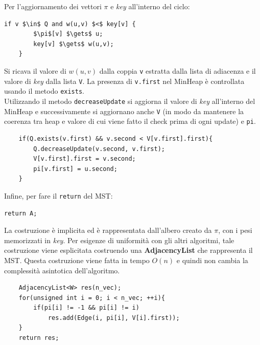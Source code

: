 \documentclass[]{article}
\begin{document}
\begin{flushleft}
	Per l'aggiornamento dei vettori $\pi$ e \textit{key} all'interno del ciclo:
	\begin{lstlisting}[mathescape=true]
	if v $\in$ Q and w(u,v) $<$ key[v] {
		$\pi$[v] $\gets$ u;
		key[v] $\gets$ w(u,v);
	}\end{lstlisting}
	Si ricava il valore di $w(u,v)$ dalla coppia \verb|v| estratta dalla lista di adiacenza e il valore di \textit{key} dalla lista \verb|V|. La presenza di \verb|v.first| nel MinHeap è controllata usando il metodo \verb|exists|.\\
	Utilizzando il metodo \verb|decreaseUpdate| si aggiorna il valore di \textit{key} all'interno del MinHeap e successivamente si aggiornano anche \verb|V| (in modo da mantenere la coerenza tra heap e valore di cui viene fatto il check prima di ogni update) e \verb|pi|.
	\lstset{language=c++, style=mystyle, firstnumber=15}
	\begin{lstlisting}
	if(Q.exists(v.first) && v.second < V[v.first].first){
		Q.decreaseUpdate(v.second, v.first);
		V[v.first].first = v.second;
		pi[v.first] = u.second;
	}\end{lstlisting}
	
	Infine, per fare il \verb|return| del MST:
	\begin{lstlisting}[mathescape=true]
	return A;\end{lstlisting}
	La costruzione è implicita ed è rappresentata dall'albero creato da $\pi$, con i pesi memorizzati in \textit{key}. Per esigenze di uniformità con gli altri algoritmi, tale costruzione viene esplicitata costruendo una \textbf{AdjacencyList} che rappresenta il MST. Questa costruzione viene fatta in tempo $O(n)$ e quindi non cambia la complessità asintotica dell'algoritmo. 
	\lstset{language=c++, style=mystyle, firstnumber=22}
	\begin{lstlisting}
	AdjacencyList<W> res(n_vec);
	for(unsigned int i = 0; i < n_vec; ++i){
		if(pi[i] != -1 && pi[i] != i)
			res.add(Edge(i, pi[i], V[i].first));
	}
	return res;\end{lstlisting}
\end{flushleft}
\end{document}
